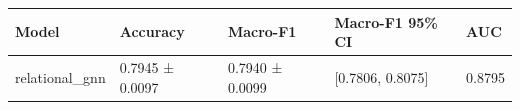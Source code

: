 \begin{tabular}{lllll}
\toprule
Model & Accuracy & Macro-F1 & Macro-F1 95\% CI & AUC \\
\midrule
relational\_gnn & 0.7945 ± 0.0097 & 0.7940 ± 0.0099 & [0.7806, 0.8075] & 0.8795 \\
\bottomrule
\end{tabular}
